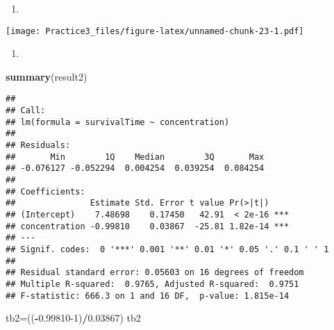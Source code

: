 \documentclass[
]{article}
\newenvironment{Shaded}{\begin{snugshade}}{\end{snugshade}}
\newcommand{\DataTypeTok}[1]{\textcolor[rgb]{0.13,0.29,0.53}{#1}}
\newcommand{\DecValTok}[1]{\textcolor[rgb]{0.00,0.00,0.81}{#1}}
\newcommand{\FloatTok}[1]{\textcolor[rgb]{0.00,0.00,0.81}{#1}}
\newcommand{\KeywordTok}[1]{\textcolor[rgb]{0.13,0.29,0.53}{\textbf{#1}}}
\newcommand{\NormalTok}[1]{#1}
\newcommand{\OperatorTok}[1]{\textcolor[rgb]{0.81,0.36,0.00}{\textbf{#1}}}
\begin{document}
\begin{enumerate}
\def\labelenumi{(\alph{enumi})}
\setcounter{enumi}{3}
\item
\end{enumerate}

\begin{Shaded}
\end{Shaded}

\texttt{[image: Practice3\_files/figure-latex/unnamed-chunk-23-1.pdf]}

\begin{enumerate}
\def\labelenumi{(\alph{enumi})}
\setcounter{enumi}{4}
\item
\end{enumerate}

\begin{Shaded}
\begin{Highlighting}[]
\KeywordTok{summary}\NormalTok{(result2)}
\end{Highlighting}
\end{Shaded}

\begin{verbatim}
## 
## Call:
## lm(formula = survivalTime ~ concentration)
## 
## Residuals:
##       Min        1Q    Median        3Q       Max 
## -0.076127 -0.052294  0.004254  0.039254  0.084254 
## 
## Coefficients:
##               Estimate Std. Error t value Pr(>|t|)    
## (Intercept)    7.48698    0.17450   42.91  < 2e-16 ***
## concentration -0.99810    0.03867  -25.81 1.82e-14 ***
## ---
## Signif. codes:  0 '***' 0.001 '**' 0.01 '*' 0.05 '.' 0.1 ' ' 1
## 
## Residual standard error: 0.05603 on 16 degrees of freedom
## Multiple R-squared:  0.9765, Adjusted R-squared:  0.9751 
## F-statistic: 666.3 on 1 and 16 DF,  p-value: 1.815e-14
\end{verbatim}

\begin{Shaded}
\begin{Highlighting}[]
\NormalTok{tb2=((}\OperatorTok{-}\FloatTok{0.99810}\DecValTok{-1}\NormalTok{)}\OperatorTok{/}\FloatTok{0.03867}\NormalTok{)}
\NormalTok{tb2}
\end{Highlighting}
\end{Shaded}
\end{document}
